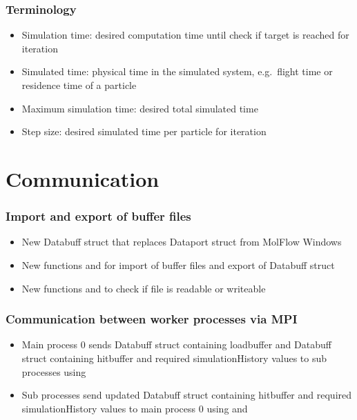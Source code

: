 \subsubsection{Terminology}
\begin{itemize}[noitemsep,topsep=0pt, partopsep=0pt]
\item Simulation time: desired computation time until check if target is reached for iteration
\item Simulated time: physical time in the simulated system, e.g.\ flight time or residence time of a particle
\item Maximum simulation time: desired total simulated time
\item Step size: desired simulated time per particle for iteration
\end{itemize}

\section{Communication}
\subsubsection{Import and export of buffer files}
\begin{itemize}[noitemsep,topsep=0pt, partopsep=0pt]
\item New Databuff struct that replaces Dataport struct from MolFlow Windows 
\item New functions  and  for import of buffer files and export of Databuff struct
\item New functions  and  to check if file is readable or writeable
\end{itemize}

\subsubsection{Communication between worker processes via MPI}
\begin{itemize}[noitemsep,topsep=0pt, partopsep=0pt]
\item Main process 0 sends Databuff struct containing loadbuffer and Databuff struct containing hitbuffer and required simulationHistory values to sub processes using 
\item Sub processes send updated Databuff struct containing hitbuffer and required simulationHistory values to main process 0 using  and 
\end{itemize}

